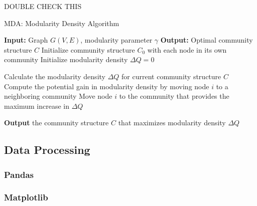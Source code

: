 DOUBLE CHECK THIS
\begin{algorithm}
\caption{MDA: Modularity Density Algorithm}\label{alg:mda}
\begin{algorithmic}[1]
\State \textbf{Input:} Graph $G(V, E)$, modularity parameter $\gamma$
\State \textbf{Output:} Optimal community structure $C$
\State Initialize community structure $C_0$ with each node in its own community
\State Initialize modularity density $\Delta Q = 0$

\Repeat
    \State Calculate the modularity density $\Delta Q$ for current community structure $C$
        \State Compute the potential gain in modularity density by moving node $i$ to a neighboring community
            \State Move node $i$ to the community that provides the maximum increase in $\Delta Q$
        \EndIf
    \EndFor
{}

\State \textbf{Output} the community structure $C$ that maximizes modularity density $\Delta Q$
\end{algorithmic}
\end{algorithm}

\newpage

\subsection{Data Processing}

\subsubsection{Pandas}

\subsubsection{Matplotlib}
